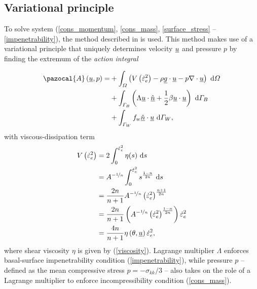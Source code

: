 \subsection{Variational principle} \label{ssn_full_stokes_var_prin}

To solve system (\ref{cons_momentum}, \ref{cons_mass}, \ref{surface_stress} -- \ref{impenetrability}),  the method described in \citet{dukowicz_2010} is used.  This method makes use of a variational principle that uniquely determines velocity $\underline{u}$ and pressure $p$ by finding the extremum of the \emph{action integral}

\begin{align}
  \label{action}
  \pazocal{A} \left(\rankone{u}, p\right) = &+ \int_{\Omega} \left( V\left( \dot{\varepsilon}_e^2 \right) - \rho \rankone{g} \cdot \rankone{u} - p \nabla \cdot \rankone{u} \right) \d{\Omega} \notag \\
  &+ \int_{\Gamma_B} \left( \Lambda \rankone{u} \cdot \normal + \frac{1}{2} \beta \rankone{u} \cdot \rankone{u} \right) \d{\Gamma_B} \notag \\
  &+ \int_{\Gamma_W} f_w \normal \cdot \rankone{u} \d{\Gamma_W},
\end{align}
with viscous-dissipation term
\begin{align}
  \label{viscous_dissipation}
  V\left( \dot{\varepsilon}_e^2 \right) &= 2 \int_0^{\dot{\varepsilon}_e^2} \eta(s) \ \mathrm{d}s \notag \\
  &= A^{-\nicefrac{1}{n}} \int_0^{\dot{\varepsilon}_e^2} s^{\frac{1-n}{2n}} \ \mathrm{d}s \notag \\
  &= \frac{2n}{n+1} A^{-\nicefrac{1}{n}} \left( \dot{\varepsilon}_e^2 \right)^{\frac{n+1}{2n}} \notag \\
  &= \frac{2n}{n+1} \left( A^{-\nicefrac{1}{n}} \left( \dot{\varepsilon}_e^2 \right)^{\frac{1-n}{2n}} \right) \dot{\varepsilon}_e^2 \notag \\
  &= \frac{4n}{n+1} \eta\left(\theta, \underline{u} \right) \dot{\varepsilon}_e^2,
\end{align}
where shear viscosity $\eta$ is given by (\ref{viscosity}).  Lagrange multiplier $\Lambda$ enforces basal-surface impenetrability condition (\ref{impenetrability}), while pressure $p$ -- defined as the mean compressive stress $p = -\sigma_{kk} / 3$ -- also takes on the role of a Lagrange multiplier to enforce incompressibility condition (\ref{cons_mass}).

